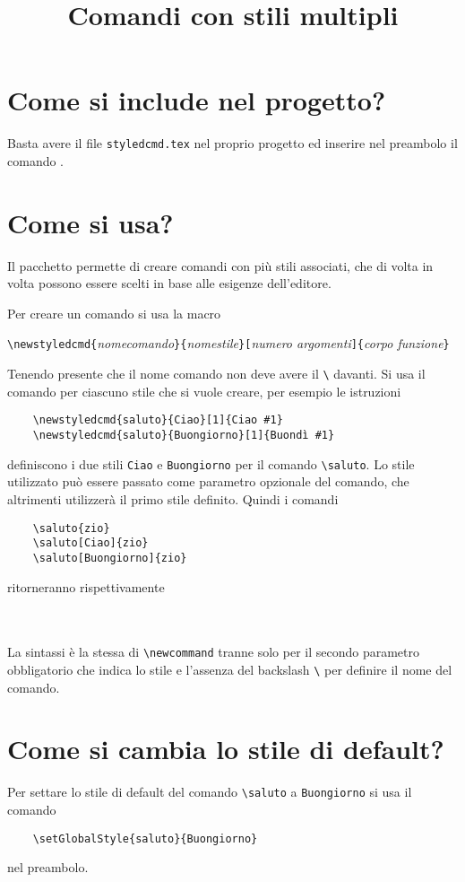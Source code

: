 \documentclass[a4paper]{article}
\title{Comandi con stili multipli}
\author{}
\begin{document}
\maketitle
\section{Come si include nel progetto?}
Basta avere il file \verb+styledcmd.tex+ nel proprio progetto ed inserire nel preambolo il comando \verb++.

\section{Come si usa?}
Il pacchetto permette di creare comandi con più stili associati, che di volta in volta possono essere scelti in base alle esigenze dell'editore.

Per creare un comando si usa la macro

\verb+\newstyledcmd{+\textit{nomecomando}\verb+}{+\textit{nomestile}\verb+}[+\textit{numero argomenti}\verb+]{+\textit{corpo funzione}\verb+}+

Tenendo presente che il nome comando non deve avere il \verb+\+ davanti. Si usa il comando per ciascuno stile che si vuole creare, per esempio le istruzioni
\begin{verbatim}
    \newstyledcmd{saluto}{Ciao}[1]{Ciao #1}
    \newstyledcmd{saluto}{Buongiorno}[1]{Buondì #1}
\end{verbatim}
definiscono i due stili \verb+Ciao+ e \verb+Buongiorno+ per il comando \verb+\saluto+. Lo stile utilizzato può essere passato come parametro opzionale del comando, che altrimenti utilizzerà il primo stile definito. Quindi i comandi
\begin{verbatim}
    \saluto{zio}
    \saluto[Ciao]{zio}
    \saluto[Buongiorno]{zio}
\end{verbatim}
ritorneranno rispettivamente\\
\\
\\

La sintassi è la stessa di \verb+\newcommand+ tranne solo per il secondo parametro obbligatorio che indica lo stile e l'assenza del backslash \verb+\+ per definire il nome del comando.
    
\section{Come si cambia lo stile di default?}
Per settare lo stile di default del comando \verb+\saluto+ a \verb+Buongiorno+ si usa il comando
\begin{verbatim}
    \setGlobalStyle{saluto}{Buongiorno}
\end{verbatim}
nel preambolo. 
\end{document}
